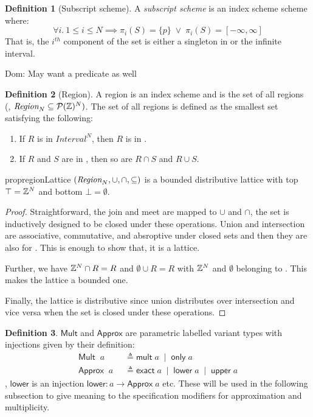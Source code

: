 \documentclass[acmlarge,review,anonymous]{acmart}\settopmatter{printfolios=true}
\newcommand{\dnote}[1]{\textcolor{darkpurple}{Dom: #1}}
\theoremstyle{definition}
\newtheorem{defn}{Definition}
\theoremstyle{plain}
\theoremstyle{remark}
\begin{document}
\begin{defn}[Subscript scheme]
  A \emph{subscript scheme} is an index scheme scheme where:
  \begin{equation*}
    \forall i.\ 1 \leq i \leq N \implies
      \pi_i (S) = \{ p \}
      \; \vee \;
      \pi_i (S) = [-\infty, \infty]
    \end{equation*}
%
  That is, the $i^{th}$ component of the set is either a singleton in \bz{} or
  the infinite interval.
\end{defn}
%
\dnote{May want a predicate as well}
   
\begin{defn}[Region]
  A region is an index scheme and  is the set of all regions (\ie{},
  $\textnormal{$\textit{Region}_{N}$} \subseteq \mathcal{P}(\textnormal{$\mathbb{Z}$})^N)$. The set of all regions is  defined
  as the smallest set satisfying the following:
%
  \begin{enumerate}
    \item If $R$ is in $\textit{Interval}^N$, then $R$ is in .
    \item If $R$ and $S$ are in , then so are $R \cap S$ and
      $R \cup S$.
  \end{enumerate}
\end{defn}
%
\begin{restatable}{prop}{regionLattice}
  \label{prop:regionLattice}
  $(\textnormal{$\textit{Region}_{N}$},\cup,\cap,\subseteq)$ is a bounded distributive lattice with top
  $\top = \textnormal{$\mathbb{Z}$}{}^N$ and bottom $\bot = \emptyset$.
\end{restatable}
%
\begin{proof}
  Straightforward, the join and meet are mapped to $\cup$ and $\cap$, the set is
  inductively designed to be closed under these operations. Union and
  intersection are associative, commutative, and absroptive under closed sets
  and then they are also for . This is enough to show that, it is a
  lattice.

  Further, we have $\textnormal{$\mathbb{Z}$}{}^N \cap R = R$ and $\emptyset \cup R = R$ with
  $\textnormal{$\mathbb{Z}$}{}^N$ and $\emptyset$ belonging to . This makes the lattice a
  bounded one.

  Finally, the lattice is distributive since union distributes over intersection
  and vice versa when the set is closed under these operations.
\end{proof}

\begin{defn}
  $\mathsf{Mult}$ and $\mathsf{Approx}$ are parametric labelled variant types
  with injections given by their definition:
%
  \begin{align*}
    \mathsf{Mult} \;\; a \;\; &
      \triangleq \mathsf{mult} \; a \;\mid\; \mathsf{only} \; a \\
    \mathsf{Approx} \;\; a \;\; &
      \triangleq \mathsf{exact} \; a \;\mid\; \mathsf{lower} \; a \;\mid\;
        \mathsf{upper} \; a
  \end{align*}
%
  \eg{}, $\mathsf{lower}$ is an injection $\mathsf{lower} : a \to \mathsf{Approx}
  \; a$ etc.
  These will be used in the following subsection to give meaning to the
  specification modifiers for approximation and multiplicity.
\end{defn}
\end{document}
